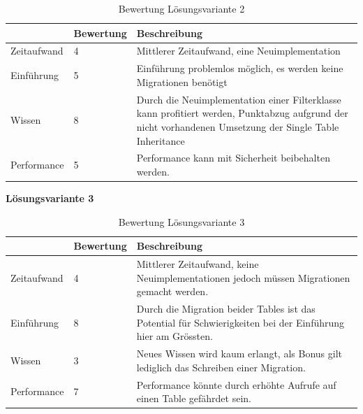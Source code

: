 \begin{table}[h!]
   \begin{tabular}{|L{0.2\textwidth}|L{0.2\textwidth}|L{0.6\textwidth}|}
      \hline
       & \color{white}\textbf{Bewertung} & \color{white}\textbf{Beschreibung}\\[2pt]
      \hline
      Zeitaufwand & 4 & Mittlerer Zeitaufwand, eine Neuimplementation \\
      \hline
      Einführung & 5 & Einführung problemlos möglich, es werden keine Migrationen benötigt \\
      \hline 
      Wissen & 8 & Durch die Neuimplementation einer Filterklasse kann profitiert werden, Punktabzug aufgrund der nicht vorhandenen Umsetzung der Single Table Inheritance \\
      \hline
      Performance & 5 & Performance kann mit Sicherheit beibehalten werden. \\
      \hline
   \end{tabular}
   \caption{Bewertung Lösungsvariante 2}
\end{table}

\textbf{Lösungsvariante 3}

\begin{table}[h!]
   \begin{tabular}{|L{0.2\textwidth}|L{0.2\textwidth}|L{0.6\textwidth}|}
      \hline
       & \color{white}\textbf{Bewertung} & \color{white}\textbf{Beschreibung}\\[2pt]
      \hline
      Zeitaufwand & 4 & Mittlerer Zeitaufwand, keine Neuimplementationen jedoch müssen Migrationen gemacht werden. \\
      \hline
      Einführung & 8 & Durch die Migration beider Tables ist das Potential für Schwierigkeiten bei der Einführung hier am Grössten. \\
      \hline 
      Wissen & 3 & Neues Wissen wird kaum erlangt, als Bonus gilt lediglich das Schreiben einer Migration. \\
      \hline
      Performance & 7 & Performance könnte durch erhöhte Aufrufe auf einen Table gefährdet sein. \\
      \hline
   \end{tabular}
   \caption{Bewertung Lösungsvariante 3}
\end{table}

\newpage

